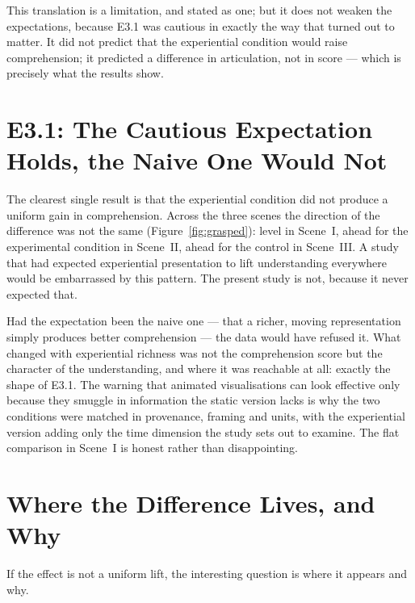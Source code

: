 This translation is a limitation, and stated as one; but it does not weaken the expectations, because E3.1 was cautious in exactly the way that turned out to matter. It did not predict that the experiential condition would raise comprehension; it predicted a difference in articulation, not in score --- which is precisely what the results show.

\section{E3.1: The Cautious Expectation Holds, the Naive One Would Not}
\label{sec:disc-e31}

The clearest single result is that the experiential condition did not produce a uniform gain in comprehension. Across the three scenes the direction of the difference was not the same (Figure~\ref{fig:grasped}): level in Scene~I, ahead for the experimental condition in Scene~II, ahead for the control in Scene~III. A study that had expected experiential presentation to lift understanding everywhere would be embarrassed by this pattern. The present study is not, because it never expected that.

Had the expectation been the naive one --- that a richer, moving representation simply produces better comprehension --- the data would have refused it. What changed with experiential richness was not the comprehension score but the character of the understanding, and where it was reachable at all: exactly the shape of E3.1. The warning that animated visualisations can look effective only because they smuggle in information the static version lacks \parencite{tversky2002} is why the two conditions were matched in provenance, framing and units, with the experiential version adding only the time dimension the study sets out to examine. The flat comparison in Scene~I is honest rather than disappointing.

\section{Where the Difference Lives, and Why}
\label{sec:disc-mechanism}

If the effect is not a uniform lift, the interesting question is where it appears and why.

